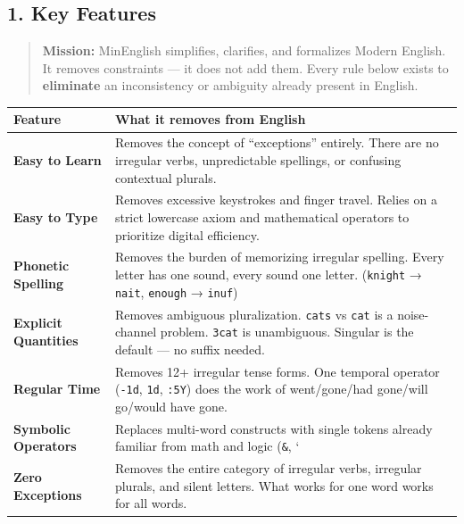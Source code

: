 \newpage

\subsection{1. Key Features}\label{key-features}

\begin{quote}
\textbf{Mission:} MinEnglish simplifies, clarifies, and formalizes
Modern English. It removes constraints --- it does not add them. Every
rule below exists to \textbf{eliminate} an inconsistency or ambiguity
already present in English.
\end{quote}

{\def\LTcaptype{} %
\begin{longtable}[]{@{}
  >{\raggedright\arraybackslash}p{}
  >{\raggedright\arraybackslash}p{}@{}}
\toprule\noalign{}
\begin{minipage}[b]{\linewidth}\raggedright
Feature
\end{minipage} & \begin{minipage}[b]{\linewidth}\raggedright
What it removes from English
\end{minipage} \\
\midrule\noalign{}
\endhead
\bottomrule\noalign{}
\endlastfoot
\textbf{Easy to Learn} & Removes the concept of ``exceptions'' entirely.
There are no irregular verbs, unpredictable spellings, or confusing
contextual plurals. \\
\textbf{Easy to Type} & Removes excessive keystrokes and finger travel.
Relies on a strict lowercase axiom and mathematical operators to
prioritize digital efficiency. \\
\textbf{Phonetic Spelling} & Removes the burden of memorizing irregular
spelling. Every letter has one sound, every sound one letter.
(\texttt{knight} → \texttt{nait}, \texttt{enough} → \texttt{inuf}) \\
\textbf{Explicit Quantities} & Removes ambiguous pluralization.
\texttt{cats} vs \texttt{cat} is a noise-channel problem. \texttt{3cat}
is unambiguous. Singular is the default --- no suffix needed. \\
\textbf{Regular Time} & Removes 12+ irregular tense forms. One temporal
operator (\texttt{-1d}, \texttt{1d}, \texttt{:5Y}) does the work of
went/gone/had gone/will go/would have gone. \\
\textbf{Symbolic Operators} & Replaces multi-word constructs with single
tokens already familiar from math and logic (\texttt{\&}, ` \\
\textbf{Zero Exceptions} & Removes the entire category of irregular
verbs, irregular plurals, and silent letters. What works for one word
works for all words. \\
\end{longtable}
}


